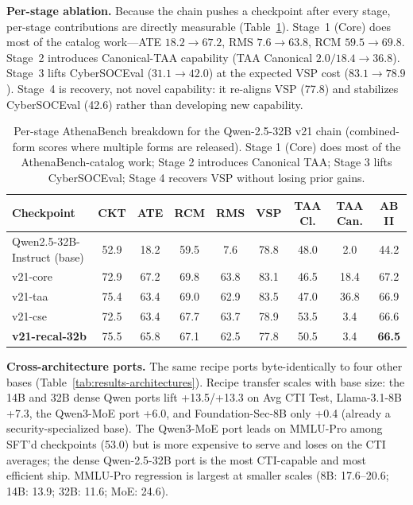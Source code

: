 \documentclass[conference]{IEEEtran}
\begin{document}
\textbf{Per-stage ablation.} Because the chain pushes a checkpoint after every stage, per-stage contributions are directly measurable (Table~\ref{tab:results-per-stage}). Stage~1 (Core) does most of the catalog work---ATE $18.2\to67.2$, RMS $7.6\to63.8$, RCM $59.5\to69.8$. Stage~2 introduces Canonical-TAA capability (TAA Canonical $2.0/18.4\to36.8$). Stage~3 lifts CyberSOCEval ($31.1\to42.0$) at the expected VSP cost ($83.1\to78.9$). Stage~4 is recovery, not novel capability: it re-aligns VSP (77.8) and stabilizes CyberSOCEval (42.6) rather than developing new capability.

\begin{table}[t]
\centering
\caption{Per-stage AthenaBench breakdown for the Qwen-2.5-32B v21 chain (combined-form scores where multiple forms are released). Stage 1 (Core) does most of the AthenaBench-catalog work; Stage 2 introduces Canonical TAA; Stage 3 lifts CyberSOCEval; Stage 4 recovers VSP without losing prior gains.}
\label{tab:results-per-stage}
\small
\begin{tabular}{lcccccccc}
\hline
\textbf{Checkpoint} & \textbf{CKT} & \textbf{ATE} & \textbf{RCM} & \textbf{RMS} & \textbf{VSP} & \textbf{TAA Cl.} & \textbf{TAA Can.} & \textbf{AB II} \\
\hline
Qwen2.5-32B-Instruct (base) & 52.9 & 18.2 & 59.5 & 7.6  & 78.8 & 48.0 & 2.0  & 44.2 \\
v21-core                    & 72.9 & 67.2 & 69.8 & 63.8 & 83.1 & 46.5 & 18.4 & 67.2 \\
v21-taa                     & 75.4 & 63.4 & 69.0 & 62.9 & 83.5 & 47.0 & 36.8 & 66.9 \\
v21-cse                     & 72.5 & 63.4 & 67.7 & 63.7 & 78.9 & 53.5 & 3.4  & 66.6 \\
\textbf{v21-recal-32b}      & 75.5 & 65.8 & 67.1 & 62.5 & 77.8 & 50.5 & 3.4  & \textbf{66.5} \\
\hline
\end{tabular}
\end{table}
\textbf{Cross-architecture ports.} The same recipe ports byte-identically to four other bases (Table~\ref{tab:results-architectures}). Recipe transfer scales with base size: the 14B and 32B dense Qwen ports lift +13.5/+13.3 on Avg CTI Test, Llama-3.1-8B +7.3, the Qwen3-MoE port +6.0, and Foundation-Sec-8B only +0.4 (already a security-specialized base). The Qwen3-MoE port leads on MMLU-Pro among SFT'd checkpoints (53.0) but is more expensive to serve and loses on the CTI averages; the dense Qwen-2.5-32B port is the most CTI-capable and most efficient ship. MMLU-Pro regression is largest at smaller scales (8B: 17.6--20.6; 14B: 13.9; 32B: 11.6; MoE: 24.6).
\end{document}
